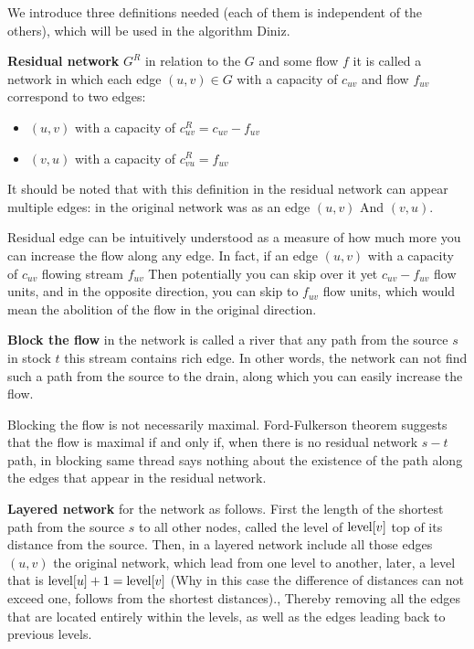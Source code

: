 We introduce three definitions needed (each of them is independent of the others), which will be used in the algorithm Diniz.

\textbf{Residual network} \textbf{$G ^ R$} in relation to the $G$ and some flow $f$ it is called a network in which each edge $(u, v) \in G$ with a capacity of $c_ {uv}$ and flow $f_ {uv}$ correspond to two edges:

\begin{itemize}

\item $(u, v)$ with a capacity of $c_ {uv} ^ R = c_ {uv} - f_ {uv}$

\item $(v, u)$ with a capacity of $c_ {vu} ^ R = f_ {uv}$

\end{itemize}

It should be noted that with this definition in the residual network can appear multiple edges: in the original network was as an edge $(u, v)$ And $(v, u)$.

Residual edge can be intuitively understood as a measure of how much more you can increase the flow along any edge. In fact, if an edge $(u, v)$ with a capacity of $c_ {uv}$ flowing stream $f_ {uv}$ Then potentially you can skip over it yet $c_ {uv}-f_ {uv}$ flow units, and in the opposite direction, you can skip to $f_ {uv}$ flow units, which would mean the abolition of the flow in the original direction.

\textbf{Block the flow} in the network is called a river that any path from the source $s$ in stock $t$ this stream contains rich edge. In other words, the network can not find such a path from the source to the drain, along which you can easily increase the flow.

Blocking the flow is not necessarily maximal. Ford-Fulkerson theorem suggests that the flow is maximal if and only if, when there is no residual network $s-t$ path, in blocking same thread says nothing about the existence of the path along the edges that appear in the residual network.

\textbf{Layered network} for the network as follows. First the length of the shortest path from the source $s$ to all other nodes, called the level of ${\rm level} [v]$ top of its distance from the source. Then, in a layered network include all those edges $(u, v)$ the original network, which lead from one level to another, later, a level that is ${\rm level} [u] + 1 = {\rm level} [v]$ (Why in this case the difference of distances can not exceed one, follows from the shortest distances)., Thereby removing all the edges that are located entirely within the levels, as well as the edges leading back to previous levels.

